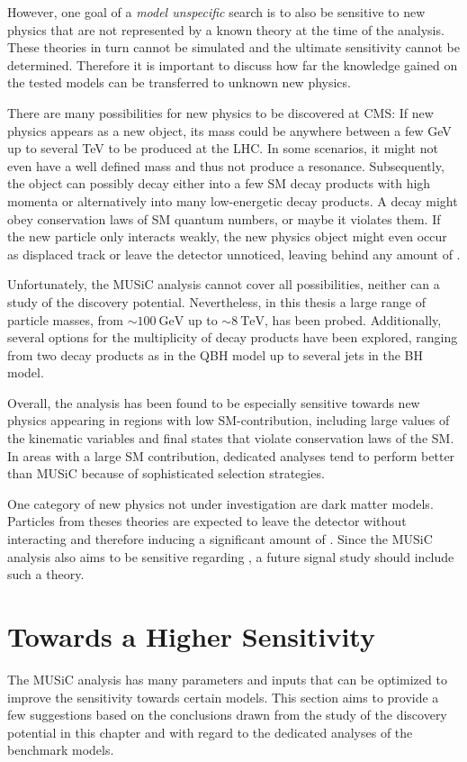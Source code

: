 However, one goal of a \emph{model unspecific} search is to also be sensitive to new physics that are not represented by a known theory at the time of the analysis. These theories in turn cannot be simulated and the ultimate sensitivity cannot be determined.
Therefore it is important to discuss how far the knowledge gained on the tested models can be transferred to unknown new physics.

There are many possibilities for new physics to be discovered at \ac{CMS}: If new physics appears as a new object, its mass could be anywhere between a few \si{\GeV} up to several \si{\TeV} to be produced at the \ac{LHC}. In some scenarios, it might not even have a well defined mass and thus not produce a resonance. Subsequently, the object can possibly decay either into a few \ac{SM} decay products with high momenta or alternatively into many low-energetic decay products. A decay might obey conservation laws of \ac{SM} quantum numbers, or maybe it violates them. If the new particle only interacts weakly, the new physics object might even occur as displaced track or leave the detector unnoticed, leaving behind any amount of \MET.

Unfortunately, the \ac{MUSiC} analysis cannot cover all possibilities, neither can a study of the discovery potential.
Nevertheless, in this thesis a large range of particle masses, from $\sim \SI{100}{\GeV}$ up to $\sim \SI{8}{\TeV}$, has been probed. Additionally, several options for the multiplicity of decay products have been explored, ranging from two decay products as in the \ac{QBH} model up to several jets in the \ac{BH} model. 

Overall, the analysis has been found to be especially sensitive towards new physics appearing in regions with low \ac{SM}-contribution, including large values of the kinematic variables and final states that violate conservation laws of the \acl{SM}. In areas with a large \ac{SM} contribution, dedicated analyses tend to perform better than \ac{MUSiC} because of sophisticated selection strategies.

One category of new physics not under investigation are dark matter models. Particles from theses theories are expected to leave the detector without interacting and therefore inducing a significant amount of \MET. Since the \ac{MUSiC} analysis also aims to be sensitive regarding \MET, a future signal study should include such a theory.


\section{Towards a Higher Sensitivity}
The \ac{MUSiC} analysis has many parameters and inputs that can be optimized to improve the sensitivity towards certain models.
This section aims to provide a few suggestions based on the conclusions drawn from the study of the discovery potential in this chapter and with regard to the dedicated analyses of the benchmark models.

